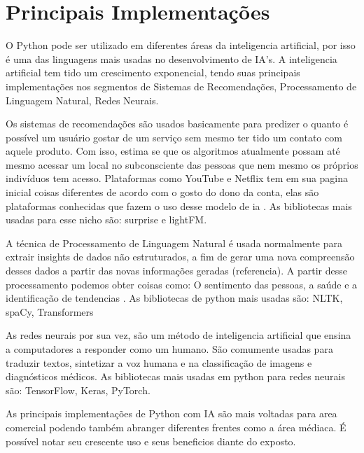 
\section{Principais Implementações}

O Python pode ser utilizado em diferentes áreas da inteligencia artificial, por isso é uma das linguagens mais usadas no desenvolvimento de IA’s. A inteligencia artificial tem tido um crescimento exponencial, tendo suas principais implementações nos segmentos de Sistemas de Recomendações, Processamento de Linguagem Natural, Redes Neurais.

Os sistemas de recomendações são usados basicamente para predizer o quanto é possível um usuário gostar de um serviço sem mesmo ter tido um contato com aquele produto. Com isso, estima se que os algoritmos atualmente possam até mesmo acessar um local no subconsciente das pessoas que nem mesmo os próprios indivíduos tem acesso. Plataformas como YouTube e Netflix tem em sua pagina inicial coisas diferentes de acordo com o gosto do dono da conta, elas são plataformas conhecidas que fazem o uso desse modelo de ia \cite{didatica2024}. As bibliotecas mais usadas para esse nicho são: surprise e lightFM.

A técnica de Processamento de Linguagem Natural é usada normalmente para extrair insights de dados não estruturados, a fim de gerar uma nova compreensão desses dados a partir das novas informações geradas (referencia). A partir desse processamento podemos obter coisas como: O sentimento das pessoas, a saúde e a identificação de tendencias \cite{google2024}. As bibliotecas de python mais usadas são: NLTK, spaCy, Transformers

As redes neurais por sua vez, são um método de inteligencia artificial que ensina a computadores a responder como um humano. \cite{aws2024} São comumente usadas para traduzir textos, sintetizar a voz humana e na classificação de imagens e diagnósticos médicos. As bibliotecas mais usadas em python para redes neurais são: TensorFlow, Keras, PyTorch.

As principais implementações de Python com IA são mais voltadas para area comercial podendo também abranger diferentes frentes como a área médiaca. É possível notar seu crescente uso e seus beneficios diante do exposto.
